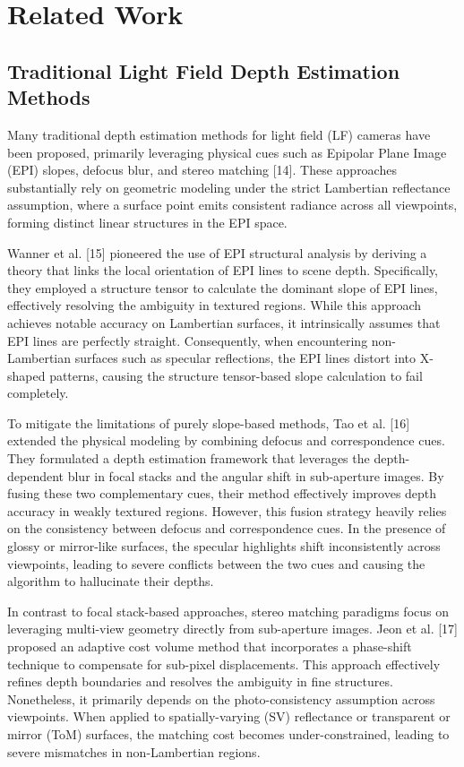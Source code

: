 \section{Related Work}

\subsection{Traditional Light Field Depth Estimation Methods}

Many traditional depth estimation methods for light field (LF) cameras have been proposed, primarily leveraging physical cues such as Epipolar Plane Image (EPI) slopes, defocus blur, and stereo matching [14]. These approaches substantially rely on geometric modeling under the strict Lambertian reflectance assumption, where a surface point emits consistent radiance across all viewpoints, forming distinct linear structures in the EPI space.

Wanner et al. [15] pioneered the use of EPI structural analysis by deriving a theory that links the local orientation of EPI lines to scene depth. Specifically, they employed a structure tensor to calculate the dominant slope of EPI lines, effectively resolving the ambiguity in textured regions. While this approach achieves notable accuracy on Lambertian surfaces, it intrinsically assumes that EPI lines are perfectly straight. Consequently, when encountering non-Lambertian surfaces such as specular reflections, the EPI lines distort into X-shaped patterns, causing the structure tensor-based slope calculation to fail completely.

To mitigate the limitations of purely slope-based methods, Tao et al. [16] extended the physical modeling by combining defocus and correspondence cues. They formulated a depth estimation framework that leverages the depth-dependent blur in focal stacks and the angular shift in sub-aperture images. By fusing these two complementary cues, their method effectively improves depth accuracy in weakly textured regions. However, this fusion strategy heavily relies on the consistency between defocus and correspondence cues. In the presence of glossy or mirror-like surfaces, the specular highlights shift inconsistently across viewpoints, leading to severe conflicts between the two cues and causing the algorithm to hallucinate their depths.

In contrast to focal stack-based approaches, stereo matching paradigms focus on leveraging multi-view geometry directly from sub-aperture images. Jeon et al. [17] proposed an adaptive cost volume method that incorporates a phase-shift technique to compensate for sub-pixel displacements. This approach effectively refines depth boundaries and resolves the ambiguity in fine structures. Nonetheless, it primarily depends on the photo-consistency assumption across viewpoints. When applied to spatially-varying (SV) reflectance or transparent or mirror (ToM) surfaces, the matching cost becomes under-constrained, leading to severe mismatches in non-Lambertian regions.

